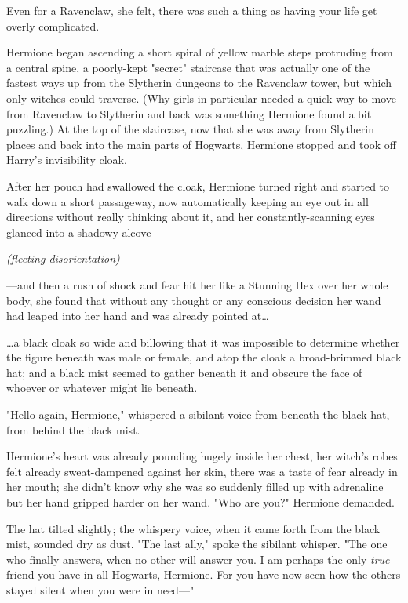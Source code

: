Even for a Ravenclaw, she felt, there was such a thing as having your life get 
overly complicated.

Hermione began ascending a short spiral of yellow marble steps protruding from 
a central spine, a poorly-kept "secret" staircase that was actually one of the 
fastest ways up from the Slytherin dungeons to the Ravenclaw tower, but which 
only witches could traverse. (Why girls in particular needed a quick way to 
move from Ravenclaw to Slytherin and back was something Hermione found a bit 
puzzling.) At the top of the staircase, now that she was away from Slytherin 
places and back into the main parts of Hogwarts, Hermione stopped and took off 
Harry's invisibility cloak.

After her pouch had swallowed the cloak, Hermione turned right and started to 
walk down a short passageway, now automatically keeping an eye out in all 
directions without really thinking about it, and her constantly-scanning eyes 
glanced into a shadowy alcove---

\emph{(fleeting disorientation)}

---and then a rush of shock and fear hit her like a Stunning Hex over her whole 
body, she found that without any thought or any conscious decision her wand had 
leaped into her hand and was already pointed at{\ldots}

{\ldots}a black cloak so wide and billowing that it was impossible to determine 
whether the figure beneath was male or female, and atop the cloak a 
broad-brimmed black hat; and a black mist seemed to gather beneath it and 
obscure the face of whoever or whatever might lie beneath.

"Hello again, Hermione," whispered a sibilant voice from beneath the black hat, 
from behind the black mist.

Hermione's heart was already pounding hugely inside her chest, her witch's 
robes felt already sweat-dampened against her skin, there was a taste of fear 
already in her mouth; she didn't know why she was so suddenly filled up with 
adrenaline but her hand gripped harder on her wand. "Who are you?" Hermione 
demanded.

The hat tilted slightly; the whispery voice, when it came forth from the black 
mist, sounded dry as dust. "The last ally," spoke the sibilant whisper. "The 
one who finally answers, when no other will answer you. I am perhaps the only 
\emph{true} friend you have in all Hogwarts, Hermione. For you have now seen 
how the others stayed silent when you were in need---"


